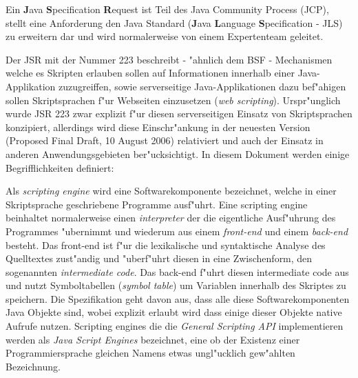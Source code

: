 Ein \textbf{J}ava \textbf{S}pecification \textbf{R}equest ist Teil des Java Community Process (JCP), stellt
eine Anforderung den Java Standard (\textbf{J}ava \textbf{L}anguage \textbf{S}pecification - JLS) zu erweitern dar und wird 
normalerweise von einem Expertenteam geleitet.

Der JSR mit der Nummer 223 \cite{JSRHP} beschreibt - "ahnlich dem BSF - Mechanismen welche es Skripten erlauben sollen auf Informationen
innerhalb einer Java-Applikation zuzugreiffen, sowie serverseitige Java-Applikationen dazu bef"ahigen sollen Skriptsprachen f"ur Webseiten 
einzusetzen (\emph{web scripting}). Urspr"unglich wurde JSR 223 zwar explizit f"ur diesen serverseitigen Einsatz von Skriptsprachen 
konzipiert, allerdings wird diese Einschr"ankung in der neuesten Version (Proposed Final Draft, 10 August 2006) relativiert
und auch der Einsatz in anderen Anwendungsgebieten ber"ucksichtigt. In diesem Dokument werden einige Begrifflichkeiten definiert:

Als \emph{scripting engine} wird eine Softwarekomponente bezeichnet, welche in einer Skriptsprache geschriebene Programme ausf"uhrt.
Eine scripting engine beinhaltet normalerweise einen \emph{interpreter} der die eigentliche Ausf"uhrung des Programmes "ubernimmt und
wiederum aus einem \emph{front-end} und einem \emph{back-end} besteht. Das front-end ist f"ur die lexikalische und syntaktische
Analyse des Quelltextes zust"andig und "uberf"uhrt diesen in eine Zwischenform, den sogenannten \emph{intermediate code}.
Das back-end f"uhrt diesen intermediate code aus und nutzt Symboltabellen (\emph{symbol table}) um Variablen innerhalb des Skriptes
zu speichern. Die Spezifikation geht davon aus, dass alle diese Softwarekomponenten Java Objekte sind, wobei explizit erlaubt wird
dass einige dieser Objekte native Aufrufe nutzen. Scripting engines die die \emph{General Scripting API} implementieren werden als 
\emph{Java Script Engines} bezeichnet, eine ob der Existenz einer Programmiersprache gleichen Namens etwas ungl"ucklich gew"ahlten 
Bezeichnung.

